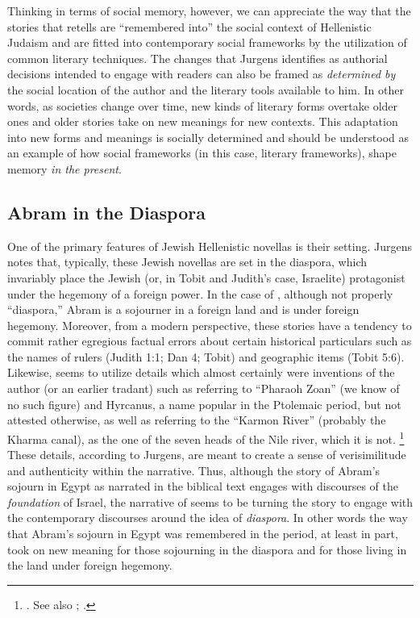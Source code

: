 Thinking in terms of social memory, however, we can appreciate the way that the stories that \ga retells are ``remembered into'' the social context of Hellenistic Judaism and are fitted into contemporary social frameworks by the utilization of common literary techniques. The changes that Jurgens identifies as authorial decisions intended to engage with readers can also be framed as \emph{determined by} the social location of the author and the literary tools available to him. In other words, as societies change over time, new kinds of literary forms overtake older ones and older stories take on new meanings for new contexts. This adaptation into new forms and meanings is socially determined and should be understood as an example of how social frameworks (in this case, literary frameworks), shape memory \emph{in the present}.

\subsection{Abram in the Diaspora}

One of the primary features of Jewish Hellenistic novellas is their setting. Jurgens notes that, typically, these Jewish novellas are set in the diaspora, which invariably place the Jewish (or, in Tobit and Judith's case, Israelite) protagonist under the hegemony of a foreign power. In the case of \ga, although not properly ``diaspora,'' Abram is a sojourner in a foreign land and is under foreign hegemony. Moreover, from a modern perspective, these stories have a tendency to commit rather egregious factual errors about certain historical particulars such as the names of rulers (Judith 1:1; Dan 4; Tobit) and geographic items (Tobit 5:6). Likewise, \ga seems to utilize details which almost certainly were inventions of the author (or an earlier tradant) such as referring to ``Pharaoh Zoan'' (we know of no such figure) and Hyrcanus, a name popular in the Ptolemaic period, but not attested otherwise, as well as referring to the ``Karmon River'' (probably the Kharma canal), as the one of the seven heads of the Nile river, which it is not.%
    \footnote{\Cite[7]{jurgens_jsj2018}. See also 
        \cite[50--59]{machiela_as2010};
        \cite[197--199]{fitzmyer2004}.}
These details, according to Jurgens, are meant to create a sense of verisimilitude and authenticity within the narrative. Thus, although the story of Abram's sojourn in Egypt as narrated in the biblical text engages with discourses of the \emph{foundation} of Israel, the narrative of \ga seems to be turning the story to engage with the contemporary discourses around the idea of \emph{diaspora}. In other words the way that Abram's sojourn in Egypt was remembered in the \secondtemple period, at least in part, took on new meaning for those sojourning in the diaspora and for those living in the land under foreign hegemony.

